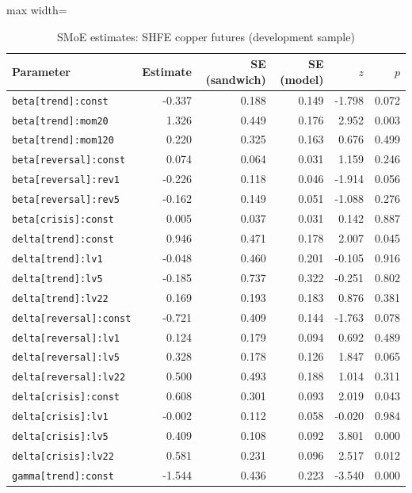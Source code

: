 \begin{table}[!htbp]\centering\scriptsize
\caption{SMoE estimates: SHFE copper futures (development sample)}\label{tab:params_cu_main}
\begin{adjustbox}{max width=\textwidth}
\begin{tabular}{lrrrrr}
\toprule
Parameter & Estimate & SE (sandwich) & SE (model) & $z$ & $p$\\
\midrule
\texttt{beta[trend]:const} & -0.337 & 0.188 & 0.149 & -1.798 & 0.072\\
\texttt{beta[trend]:mom20} & 1.326 & 0.449 & 0.176 & 2.952 & 0.003\\
\texttt{beta[trend]:mom120} & 0.220 & 0.325 & 0.163 & 0.676 & 0.499\\
\texttt{beta[reversal]:const} & 0.074 & 0.064 & 0.031 & 1.159 & 0.246\\
\texttt{beta[reversal]:rev1} & -0.226 & 0.118 & 0.046 & -1.914 & 0.056\\
\texttt{beta[reversal]:rev5} & -0.162 & 0.149 & 0.051 & -1.088 & 0.276\\
\texttt{beta[crisis]:const} & 0.005 & 0.037 & 0.031 & 0.142 & 0.887\\
\texttt{delta[trend]:const} & 0.946 & 0.471 & 0.178 & 2.007 & 0.045\\
\texttt{delta[trend]:lv1} & -0.048 & 0.460 & 0.201 & -0.105 & 0.916\\
\texttt{delta[trend]:lv5} & -0.185 & 0.737 & 0.322 & -0.251 & 0.802\\
\texttt{delta[trend]:lv22} & 0.169 & 0.193 & 0.183 & 0.876 & 0.381\\
\texttt{delta[reversal]:const} & -0.721 & 0.409 & 0.144 & -1.763 & 0.078\\
\texttt{delta[reversal]:lv1} & 0.124 & 0.179 & 0.094 & 0.692 & 0.489\\
\texttt{delta[reversal]:lv5} & 0.328 & 0.178 & 0.126 & 1.847 & 0.065\\
\texttt{delta[reversal]:lv22} & 0.500 & 0.493 & 0.188 & 1.014 & 0.311\\
\texttt{delta[crisis]:const} & 0.608 & 0.301 & 0.093 & 2.019 & 0.043\\
\texttt{delta[crisis]:lv1} & -0.002 & 0.112 & 0.058 & -0.020 & 0.984\\
\texttt{delta[crisis]:lv5} & 0.409 & 0.108 & 0.092 & 3.801 & 0.000\\
\texttt{delta[crisis]:lv22} & 0.581 & 0.231 & 0.096 & 2.517 & 0.012\\
\texttt{gamma[trend]:const} & -1.544 & 0.436 & 0.223 & -3.540 & 0.000\\

\end{tabular}
\end{adjustbox}
\end{table}
